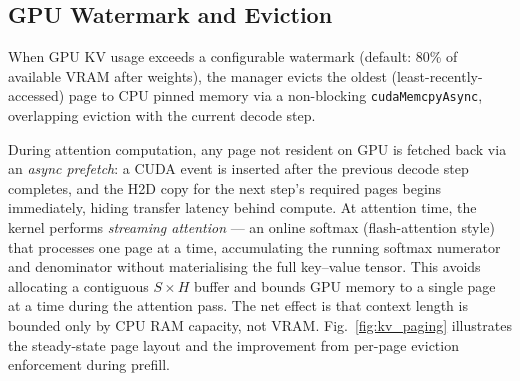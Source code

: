 \documentclass[lettersize,journal]{IEEEtran}
\begin{document}
\subsection{GPU Watermark and Eviction}

When GPU KV usage exceeds a configurable watermark (default: 80\% of
available VRAM after weights), the manager evicts the oldest (least-recently-accessed)
page to CPU pinned memory via a non-blocking \texttt{cudaMemcpyAsync}, overlapping
eviction with the current decode step.

During attention computation, any page not resident on GPU is fetched back via
an \emph{async prefetch}: a CUDA event is inserted after the previous decode
step completes, and the H2D copy for the next step's required pages begins
immediately, hiding transfer latency behind compute. At attention time, the
kernel performs \emph{streaming attention} --- an online softmax (flash-attention
style) that processes one page at a time, accumulating the running softmax
numerator and denominator without materialising the full key--value tensor.
This avoids allocating a contiguous $S \times H$ buffer and bounds GPU memory
to a single page at a time during the attention pass. The net effect is that
context length is bounded only by CPU RAM capacity, not VRAM.
Fig.~\ref{fig:kv_paging} illustrates the steady-state page layout and the
improvement from per-page eviction enforcement during prefill.
\end{document}
